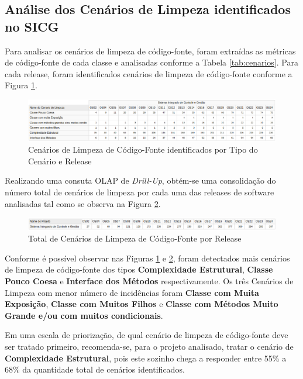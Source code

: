 \subsection{Análise dos Cenários de Limpeza identificados no SICG}

Para analisar os cenários de limpeza de código-fonte, foram extraídas as métricas de código-fonte de cada classe e analisadas conforme a Tabela \ref{tab:cenarios}. Para cada release, foram identificados cenários de limpeza de código-fonte conforme a Figura \ref{fig:cenarios-release}.


\begin{figure}[ht!]
\centering
\includegraphics[keepaspectratio=true,scale=0.47]{figuras/total-cenario-tipo.eps}
\caption{Cenários de Limpeza de Código-Fonte identificados por Tipo do Cenário e Release}
\label{fig:cenarios-release}
\end{figure}
\FloatBarrier


Realizando uma consuta OLAP de \textit{Drill-Up}, obtém-se uma consolidação do número total de cenários de limpeza por cada uma das releases de software analisadas tal como se observa na Figura \ref{fig:cenarios-total}.

\begin{figure}[ht!]
\centering
\includegraphics[keepaspectratio=true,scale=0.48]{figuras/total-cenarios-release.eps}
\caption{Total de Cenários de Limpeza de Código-Fonte por Release}
\label{fig:cenarios-total}
\end{figure}
\FloatBarrier

Conforme é possível observar nas Figuras \ref{fig:cenarios-release} e \ref{fig:cenarios-total}, foram detectados mais cenários de limpeza de código-fonte dos tipos \textbf{Complexidade Estrutural}, \textbf{Classe Pouco Coesa} e \textbf{Interface dos Métodos} respectivamente. Os três Cenários de Limpeza com menor número de incidências foram \textbf{Classe com Muita Exposição}, \textbf{Classe com Muitos Filhos} e \textbf{Classe com Métodos Muito Grande e/ou com muitos condicionais}. 

Em uma escala de priorização, de qual cenário de limpeza de código-fonte deve ser tratado primeiro, recomenda-se, para o projeto analisado, tratar o cenário de \textbf{Complexidade Estrutural}, pois este sozinho chega a responder entre 55\% a 68\% da quantidade total de cenários identificados. 

